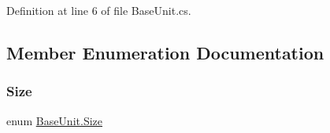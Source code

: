 Definition at line 6 of file Base\+Unit.\+cs.



\subsection{Member Enumeration Documentation}
\mbox{\label{class_base_unit_a4c855b587a2eecd744c4c511aeda7da1}} 
\subsubsection{\texorpdfstring{Size}{Size}}
{\footnotesize\ttfamily enum \mbox{\hyperlink{class_base_unit_a4c855b587a2eecd744c4c511aeda7da1}{Base\+Unit.\+Size}}\hspace{0.3cm}{\ttfamily [strong]}}

